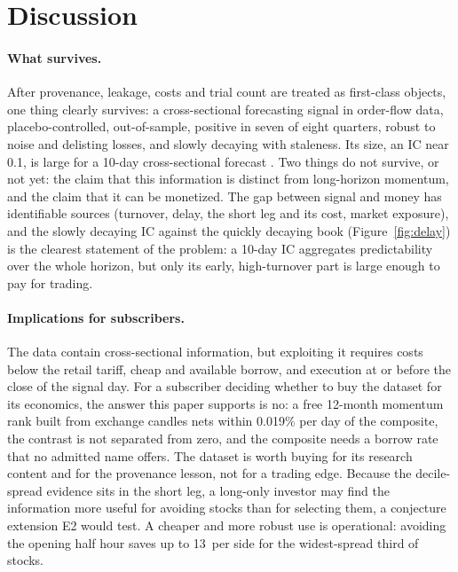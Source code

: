 \section{Discussion}\label{sec:discussion}

\paragraph{What survives.} After provenance, leakage, costs and trial count are treated as first-class objects, one thing clearly survives: a cross-sectional forecasting signal in order-flow data, placebo-controlled, out-of-sample, positive in seven of eight quarters, robust to noise and delisting losses, and slowly decaying with staleness. Its size, an IC near 0.1, is large for a 10-day cross-sectional forecast \citep{grinold2000a}. Two things do not survive, or not yet: the claim that this information is distinct from long-horizon momentum, and the claim that it can be monetized. The gap between signal and money has identifiable sources (turnover, delay, the short leg and its cost, market exposure), and the slowly decaying IC against the quickly decaying book (Figure~\ref{fig:delay}) is the clearest statement of the problem: a 10-day IC aggregates predictability over the whole horizon, but only its early, high-turnover part is large enough to pay for trading.

\paragraph{Implications for subscribers.} The data contain cross-sectional information, but exploiting it requires costs below the retail tariff, cheap and available borrow, and execution at or before the close of the signal day. For a subscriber deciding whether to buy the dataset for its economics, the answer this paper supports is no: a free 12-month momentum rank built from exchange candles nets within 0.019\% per day of the composite, the contrast is not separated from zero, and the composite needs a borrow rate that no admitted name offers. The dataset is worth buying for its research content and for the provenance lesson, not for a trading edge. Because the decile-spread evidence sits in the short leg, a long-only investor may find the information more useful for avoiding stocks than for selecting them, a conjecture extension E2 would test. A cheaper and more robust use is operational: avoiding the opening half hour saves up to 13\bp\ per side for the widest-spread third of stocks.

